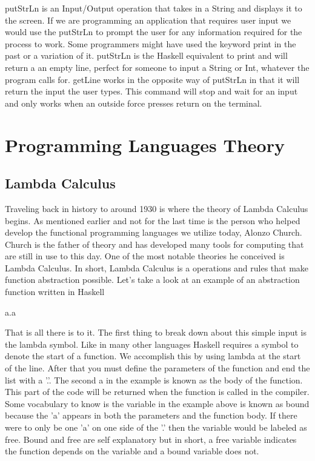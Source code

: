 \documentclass{article}
\begin{document}
    \noindent putStrLn is an Input/Output operation that takes in a String and displays it to the screen. If we are programming an application that requires user input we would use the putStrLn to prompt the user for any information required for the process to work. Some programmers might have used the keyword print in the past or a variation of it. putStrLn is the Haskell equivalent to print and will return a an empty line, perfect for someone to input a String or Int, whatever the program calls for. getLine works in the opposite way of putStrLn in that it will return the input the user types. This command will stop and wait for an input and only works when an outside force presses return on the terminal.

\section{Programming Languages Theory}
    \subsection{Lambda Calculus}
    Traveling back in history to around 1930 is where the theory of Lambda Calculus begins. As mentioned earlier and not for the last time is the person who helped develop the functional programming languages we utilize today, Alonzo Church. Church is the father of theory and has developed many tools for computing that are still in use to this day. One of the most notable theories he conceived is Lambda Calculus. In short, Lambda Calculus is a operations and rules that make function abstraction possible. Let's take a look at an example of an abstraction function written in Haskell
    
    \medskip
              \lambda a.a
    \medskip
    
    \noindent That is all there is to it. The first thing to break down about this simple input is the lambda symbol. Like in many other languages Haskell requires a symbol to denote the start of a function. We accomplish this by using lambda at the start of the line. After that you must define the parameters of the function and end the list with a '.'. The second a in the example is known as the body of the function. This part of the code will be returned when the function is called in the compiler. Some vocabulary to know is the variable in the example above is known as bound because the 'a' appears in both the parameters and the function body. If there were to only be one 'a' on one side of the '.' then the variable would be labeled as free. Bound and free are self explanatory but in short, a free variable indicates the function depends on the variable and a bound variable does not. 
    
\end{document}
